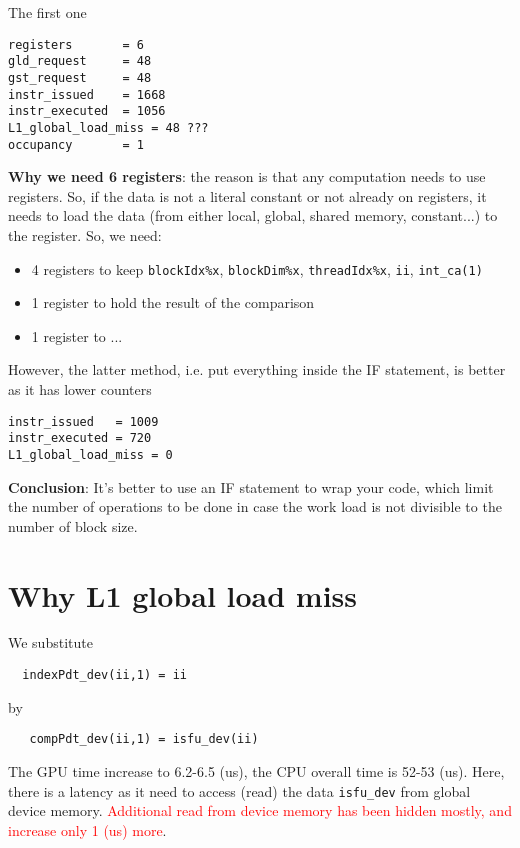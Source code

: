 The first one
\begin{verbatim}
registers       = 6
gld_request     = 48
gst_request     = 48
instr_issued    = 1668
instr_executed  = 1056
L1_global_load_miss = 48 ???
occupancy       = 1
\end{verbatim}

{\bf Why we need 6 registers}: the reason is that any computation
needs to use registers. So, if the data is not a literal constant or
not already on registers, it needs to load the data (from either
local, global, shared memory, constant...) to the register. So, we
need: 
\begin{itemize}
\item 4 registers to keep \verb!blockIdx%x!, \verb!blockDim%x!,
  \verb!threadIdx%x!, \verb!ii!, \verb!int_ca(1)!
\item 1 register to hold the result of the comparison
\item 1 register to  ...
\end{itemize}

However, the latter method, i.e. put everything inside the IF
statement, is better as it has lower counters
\begin{verbatim}
instr_issued   = 1009
instr_executed = 720
L1_global_load_miss = 0  
\end{verbatim}

\begin{framed}
  {\bf Conclusion}: It's better to use an IF statement to wrap your
  code, which limit the number of operations to be done in case the
  work load is not divisible to the number of block size. 
\end{framed}

\section{Why L1 global load miss}
\label{sec:why-l1-global}

We substitute 
\begin{verbatim}
  indexPdt_dev(ii,1) = ii
\end{verbatim}
by 
\begin{verbatim}
   compPdt_dev(ii,1) = isfu_dev(ii)
\end{verbatim}
The GPU time increase to 6.2-6.5 (us), the CPU overall time is 52-53
(us). Here, there is a latency as it need to access (read) the data
\verb!isfu_dev! from global device memory.
\textcolor{red}{Additional read from device memory has been hidden
  mostly, and increase only 1 (us) more}.

